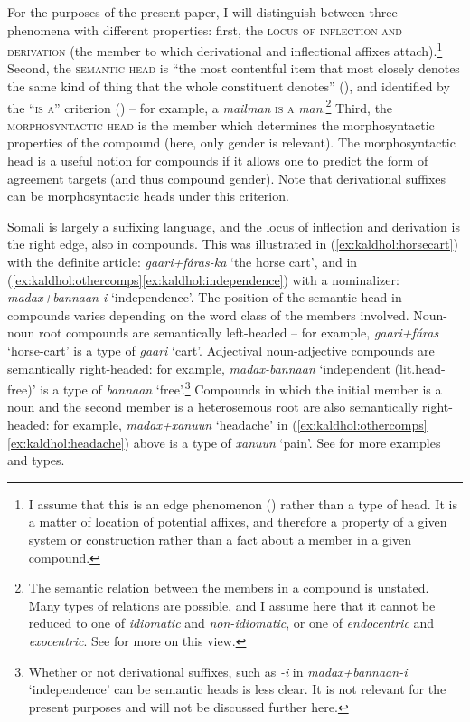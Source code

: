 \documentclass[output=paper]{langscibook}
\begin{document}
For the purposes of the present paper, I will distinguish between three phenomena with different properties: first, the \textsc{locus of inflection and derivation} (the member to which derivational and inflectional affixes attach).\footnote{I assume that this is an edge phenomenon (\citealt[31]{Bauer2017}) rather than a type of head. It is a matter of location of potential affixes, and therefore a property of a given system or construction rather than a fact about a member in a given compound.} 
Second, the \textsc{semantic head} is ``the most contentful item that most closely denotes the same kind of thing that the whole constituent denotes'' (\citealt[259]{Croft2001a}), and identified by the ``\textsc{is a}'' criterion (\citealt{Allen1978}) -- for example, a \textit{mailman} \textsc{is a} \textit{man}.\footnote{The semantic relation between the members in a compound is unstated. Many types of relations are possible, and I assume here that it cannot be reduced to one of \textit{idiomatic} and \textit{non-idiomatic}, or one of \textit{endocentric} and \textit{exocentric}. See \textcite{Bauer2008,Bauer2017,Pepper2020,Eiesland2015,Jackendoff2016} for more on this view.} 
Third, the \textsc{morphosyntactic head} is the member which determines the morphosyntactic properties of the compound (here, only gender is relevant).  The morphosyntactic head is a useful notion for compounds if it allows one to predict the form of agreement targets (and thus compound gender). Note that derivational suffixes can be morphosyntactic heads under this criterion.

Somali is largely a suffixing language, and the locus of inflection and derivation is the right edge, also in compounds. This was illustrated in (\ref{ex:kaldhol:horsecart}) with the definite article: \textit{gaari+f\'aras-ka} `the horse cart', and in (\ref{ex:kaldhol:othercomps}\ref{ex:kaldhol:independence}) with a nominalizer: \textit{madax+bannaan-i} `independence'. The position of the semantic head in compounds varies depending on the word class of the members involved. Noun-noun root compounds are semantically left-headed -- for example, \textit{gaari+f\'aras} `horse-cart' is a type of \textit{gaari} `cart'. Adjectival noun-adjective compounds are semantically right-headed: for example, \textit{madax-bannaan} `independent (lit.\@ head-free)' is a type of \textit{bannaan} `free'.\footnote{Whether or not derivational suffixes, such as \textit{-i} in \textit{madax+bannaan-i} `independence' can be semantic heads is less clear. It is not relevant for the present purposes and will not be discussed further here.} 
Compounds in which the initial member is a noun and the second member is a heterosemous root are also semantically right-headed: for example, \textit{madax+xanuun} `headache' in (\ref{ex:kaldhol:othercomps}\ref{ex:kaldhol:headache}) above is a type of \textit{xanuun} `pain'. See \textcite{Banti2016a} for more examples and types.
\end{document}
